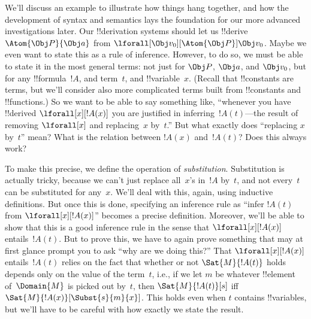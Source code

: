 \documentclass[../../../include/open-logic-section]{subfiles}
\begin{document}

We'll discuss an example to illustrate how things hang together, and
how the development of syntax and semantics lays the foundation for
our more advanced investigations later. Our !!{derivation} systems should let
us !!{derive} $\Atom{\Obj P}{\Obj a}$ from $\lforall[\Obj
v_0][\Atom{\Obj P}]{\Obj v_0}$. Maybe we even want to state this as a
rule of inference. However, to do so, we must be able to state it in
the most general terms: not just for $\Obj P$, $\Obj a$, and $\Obj
v_0$, but for any !!{formula}~$!A$, and term~$t$, and
!!{variable}~$x$. (Recall that !!{constant}s are terms, but we'll
consider also more complicated terms built from !!{constant}s and
!!{function}s.) So we want to be able to say something like,
``whenever you have !!{derive}d $\lforall[x][!A(x)]$ you are justified
in inferring~$!A(t)$---the result of removing $\lforall[x]$ and
replacing~$x$ by~$t$.'' But what exactly does ``replacing $x$ by~$t$''
mean? What is the relation between $!A(x)$ and~$!A(t)$?  Does this
always work?

To make this precise, we define the operation of \emph{substitution}.
Substitution is actually tricky, because we can't just replace
all~$x$'s in~$!A$ by~$t$, and not every~$t$ can be substituted for
any~$x$. We'll deal with this, again, using inductive definitions. But
once this is done, specifying an inference rule as ``infer $!A(t)$
from $\lforall[x][!A(x)]$'' becomes a precise definition.  Moreover,
we'll be able to show that this is a good inference rule in the sense
that $\lforall[x][!A(x)]$ entails~$!A(t)$. But to prove this, we have
to again prove something that may at first glance prompt you to ask
``why are we doing this?'' That $\lforall[x][!A(x)]$ entails~$!A(t)$
relies on the fact that whether or not $\Sat{M}{!A(t)}$ holds depends
only on the value of the term~$t$, i.e., if we let $m$ be whatever
!!{element} of~$\Domain{M}$ is picked out by~$t$, then
$\Sat{M}{!A(t)}[s]$ iff $\Sat{M}{!A(x)}[\Subst{s}{m}{x}]$. This holds
even when $t$ contains !!{variable}s, but we'll have to be careful
with how exactly we state the result.
\end{document}
